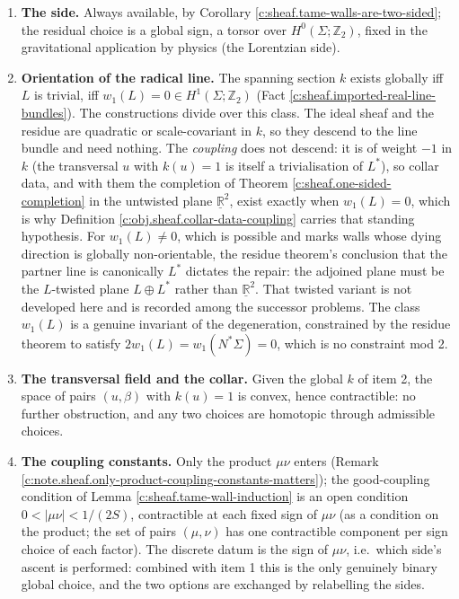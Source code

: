 \documentclass[11pt]{article}
\theoremstyle{definition}
\theoremstyle{plain}
\providecommand{\R}{}\renewcommand{\R}{\mathbb{R}}
\providecommand{\Sig}{}\renewcommand{\Sig}{\Sigma}
\providecommand{\shL}{}\renewcommand{\shL}{L}
\begin{document}
\begin{enumerate}
\item \textbf{The side.} Always available, by Corollary \ref{c:sheaf.tame-walls-are-two-sided}; the residual choice is a global sign, a torsor over $H^0(\Sig; \mathbb{Z}_2)$, fixed in the gravitational application by physics (the Lorentzian side).
\item \textbf{Orientation of the radical line.} The spanning section $k$ exists globally iff $\shL$ is trivial, iff $w_1(\shL) = 0 \in H^1(\Sig; \mathbb{Z}_2)$ (Fact \ref{c:sheaf.imported-real-line-bundles}). The constructions divide over this class. The ideal sheaf and the residue are quadratic or scale-covariant in $k$, so they descend to the line bundle and need nothing. The \emph{coupling} does not descend: it is of weight $-1$ in $k$ (the transversal $u$ with $k(u) = 1$ is itself a trivialisation of $\shL^*$), so collar data, and with them the completion of Theorem \ref{c:sheaf.one-sided-completion} in the untwisted plane $\underline{\R}^2$, exist exactly when $w_1(\shL) = 0$, which is why Definition \ref{c:obj.sheaf.collar-data-coupling} carries that standing hypothesis. For $w_1(\shL) \neq 0$, which is possible and marks walls whose dying direction is globally non-orientable, the residue theorem's conclusion that the partner line is canonically $\shL^*$ dictates the repair: the adjoined plane must be the $\shL$-twisted plane $\shL \oplus \shL^*$ rather than $\underline{\R}^2$. That twisted variant is not developed here and is recorded among the successor problems. The class $w_1(\shL)$ is a genuine invariant of the degeneration, constrained by the residue theorem to satisfy $2 w_1(\shL) = w_1(N^*\Sig) = 0$, which is no constraint mod 2.
\item \textbf{The transversal field and the collar.} Given the global $k$ of item 2, the space of pairs $(u, \beta)$ with $k(u) = 1$ is convex, hence contractible: no further obstruction, and any two choices are homotopic through admissible choices.
\item \textbf{The coupling constants.} Only the product $\mu\nu$ enters (Remark \ref{c:note.sheaf.only-product-coupling-constants-matters}); the good-coupling condition of Lemma \ref{c:sheaf.tame-wall-induction} is an open condition $0 < |\mu\nu| < 1/(2S)$, contractible at each fixed sign of $\mu\nu$ (as a condition on the product; the set of pairs $(\mu,\nu)$ has one contractible component per sign choice of each factor). The discrete datum is the sign of $\mu\nu$, i.e.\ which side's ascent is performed: combined with item 1 this is the only genuinely binary global choice, and the two options are exchanged by relabelling the sides.
\end{enumerate}
\end{document}
